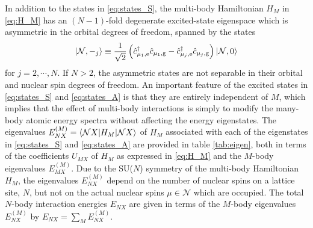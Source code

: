 \documentclass[preprint,showkeys,nofootinbib]{revtex4-1}
\newcommand{\f}{\dfrac} %
\newcommand{\p}[1]{\left(#1\right)} %
\newcommand{\bk}{\braket} %
\newcommand{\g}{\text{g}}
\newcommand{\e}{\text{e}}
\renewcommand{\c}{\hat{c}}
\newcommand{\N}{\mathcal{N}}
\newcommand{\1}{\mathds{1}}
\begin{document}
In addition to the states in \eqref{eq:states_S}, the multi-body
Hamiltonian $H_M$ in \eqref{eq:H_M} has an $\p{N-1}$-fold degenerate
excited-state eigenspace which is asymmetric in the orbital degrees of
freedom, spanned by the states
\begin{align}
  \ket{\N,-_j} \equiv \f1{\sqrt2}
  \p{\c_{\mu_1,\e}^\dag \c_{\mu_1,\g} - \c_{\mu_j,\e}^\dag \c_{\mu_j,\g}}
  \ket{\N,0}
  \label{eq:states_A}
\end{align}
for $j=2,\cdots,N$.  If $N>2$, the asymmetric states are not separable
in their orbital and nuclear spin degrees of freedom.  An important
feature of the excited states in \eqref{eq:states_S} and
\eqref{eq:states_A} is that they are entirely independent of $M$,
which implies that the effect of multi-body interactions is simply to
modify the many-body atomic energy spectra without affecting the
energy eigenstates.  The eigenvalues $E_{NX}^{(M)}=\bk{\N X|H_M|\N X}$
of $H_M$ associated with each of the eigenstates in
\eqref{eq:states_S} and \eqref{eq:states_A} are provided in table
\ref{tab:eigen}, both in terms of the coefficients $U_{MX}$ of $H_M$
as expressed in \eqref{eq:H_M} and the $M$-body eigenvalues
$E_{MX}^{(M)}$.  Due to the SU($N$) symmetry of the multi-body
Hamiltonian $H_M$, the eigenvalues $E_{NX}^{(M)}$ depend on the number
of nuclear spins on a lattice site, $N$, but not on the actual nuclear
spins $\mu\in\N$ which are occupied.  The total $N$-body interaction
energies $E_{NX}$ are given in terms of the $M$-body eigenvalues
$E_{NX}^{(M)}$ by $E_{NX}=\sum_ME_{NX}^{(M)}$.
\end{document}
